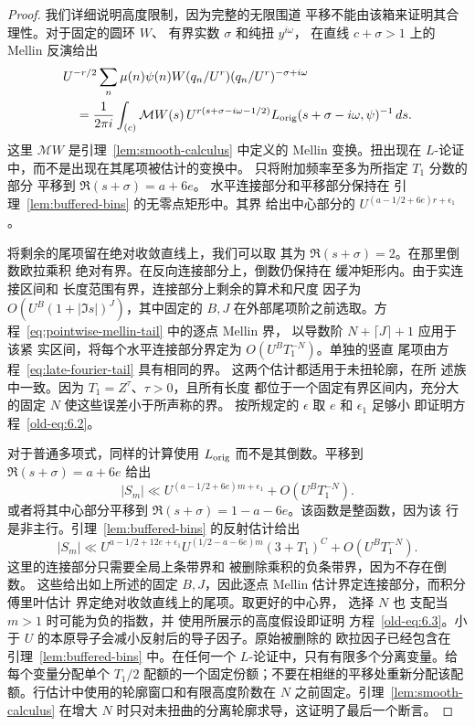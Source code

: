 \documentclass[11pt,a4paper]{article}
\numberwithin{equation}{section}
\numberwithin{figure}{section}
\theoremstyle{definition}
\theoremstyle{remark}
\begin{document}
\begin{proof}
我们详细说明高度限制，因为完整的无限围道
平移不能由该箱来证明其合理性。对于固定的圆环 \(W\)、
有界实数 \(\sigma\) 和纯扭 \(y^{i\omega}\)，
在直线 \(c+\sigma>1\) 上的 Mellin 反演给出
\[
 \begin{split}
 &U^{-r/2}\sum_n\mu(n)\psi(n)
       W(q_n/U^r)(q_n/U^r)^{-\sigma+i\omega}\\
 &\quad=\frac1{2\pi i}\int_{(c)}
  \mathcal MW(s)\,
  U^{r(s+\sigma-i\omega-1/2)}
  L_{\rm orig}(s+\sigma-i\omega,\psi)^{-1}\,ds.
 \end{split}
\]
这里 \(\mathcal MW\) 是引理~\ref{lem:smooth-calculus} 中定义的
Mellin 变换。扭出现在
\(L\)-论证中，而不是出现在其尾项被估计的变换中。
只将附加频率至多为所指定 \(T_1\) 分数的部分
平移到 \(\Re(s+\sigma)=a+6e\)。
水平连接部分和平移部分保持在
引理~\ref{lem:buffered-bins} 的无零点矩形中。其界
给出中心部分的 \(U^{(a-1/2+6e)r+\epsilon_1}\)。

将剩余的尾项留在绝对收敛直线上，我们可以取
其为 \(\Re(s+\sigma)=2\)。在那里倒数欧拉乘积
绝对有界。在反向连接部分上，倒数仍保持在
缓冲矩形内。由于实连接区间和
长度范围有界，连接部分上剩余的算术和尺度
因子为 \(O(U^B(1+|\Im s|)^J)\)，其中固定的 \(B,J\)
在外部尾项阶之前选取。方程~\eqref{eq:pointwise-mellin-tail} 中的逐点 Mellin 界，
以导数阶 \(N+\lceil J\rceil+1\) 应用于该紧
实区间，将每个水平连接部分界定为 \(O(U^B T_1^{-N})\)。单独的竖直
尾项由方程~\eqref{eq:late-fourier-tail} 具有相同的界。
这两个估计都适用于未扭轮廓，在所
述族中一致。因为 \(T_1=Z^\tau\)、\(\tau>0\)，且所有长度
都位于一个固定有界区间内，充分大的固定 \(N\)
使这些误差小于所声称的界。
按所规定的 \(\epsilon\) 取 \(e\) 和 \(\epsilon_1\) 足够小
即证明方程~\eqref{old-eq:6.2}。

对于普通多项式，同样的计算使用
\(L_{\rm orig}\) 而不是其倒数。平移到
\(\Re(s+\sigma)=a+6e\) 给出
\[
 |S_m|\ll U^{(a-1/2+6e)m+\epsilon_1}
          +O(U^B T_1^{-N}).
\]
或者将其中心部分平移到
\(\Re(s+\sigma)=1-a-6e\)。该函数是整函数，因为该
行是非主行。引理~\ref{lem:buffered-bins} 的反射估计给出
\[
 |S_m|\ll
 U^{a-1/2+12e+\epsilon_1}
 U^{(1/2-a-6e)m}(3+T_1)^C
 +O(U^B T_1^{-N}).
\]
这里的连接部分只需要全局上条带界和
被删除乘积的负条带界，因为不存在倒数。
这些给出如上所述的固定 \(B,J\)，因此逐点
Mellin 估计界定连接部分，而积分傅里叶估计
界定绝对收敛直线上的尾项。取更好的中心界，
选择 \(N\) 也
支配当 \(m>1\) 时可能为负的指数，并
使用所展示的高度假设即证明
方程~\eqref{old-eq:6.3}。小于
\(U\) 的本原导子会减小反射后的导子因子。原始被删除的
欧拉因子已经包含在
引理~\ref{lem:buffered-bins} 中。在任何一个 \(L\)-论证中，只有有限多个分离变量。给每个变量分配单个 \(T_1/2\) 配额的一个固定份额；不要在相继的平移处重新分配该配额。行估计中使用的轮廓窗口和有限高度阶数在 \(N\) 之前固定。引理~\ref{lem:smooth-calculus} 在增大 \(N\) 时只对未扭曲的分离轮廓求导，这证明了最后一个断言。
\end{proof}
\end{document}
